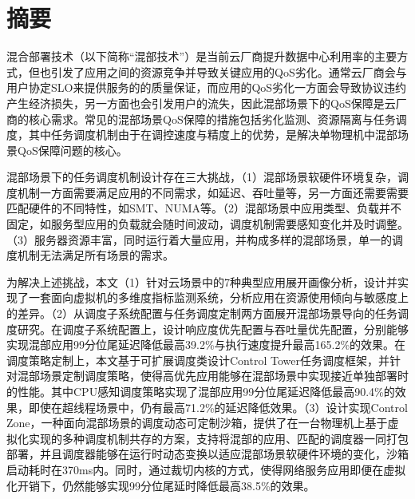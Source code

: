 
\maketitle%
\MAKETITLE%
\makedeclaration%
\intobmk\chapter*{摘\quad 要}%
\setcounter{page}{1}%


混合部署技术（以下简称“混部技术”）是当前云厂商提升数据中心利用率的主要方式，但也引发了应用之间的资源竞争并导致关键应用的QoS劣化。通常云厂商会与用户协定SLO来提供服务的的质量保证，而应用的QoS劣化一方面会导致协议违约产生经济损失，另一方面也会引发用户的流失，因此混部场景下的QoS保障是云厂商的核心需求。常见的混部场景QoS保障的措施包括劣化监测、资源隔离与任务调度，其中任务调度机制由于在调控速度与精度上的优势，是解决单物理机中混部场景QoS保障问题的核心。

混部场景下的任务调度机制设计存在三大挑战，（1）混部场景软硬件环境复杂，调度机制一方面需要满足应用的不同需求，如延迟、吞吐量等，另一方面还需要需要匹配硬件的不同特性，如SMT、NUMA等。（2）混部场景中应用类型、负载并不固定，如服务型应用的负载就会随时间波动，调度机制需要感知变化并及时调整。（3）服务器资源丰富，同时运行着大量应用，并构成多样的混部场景，单一的调度机制无法满足所有场景的需求。

为解决上述挑战，本文（1）针对云场景中的7种典型应用展开画像分析，设计并实现了一套面向虚拟机的多维度指标监测系统，分析应用在资源使用倾向与敏感度上的差异。（2）从调度子系统配置与任务调度定制两方面展开混部场景导向的任务调度研究。在调度子系统配置上，设计响应度优先配置与吞吐量优先配置，分别能够实现混部应用99分位尾延迟降低最高39.2\%与执行速度提升最高165.2\%的效果。在调度策略定制上，本文基于可扩展调度类设计Control Tower任务调度框架，并针对混部场景定制调度策略，使得高优先应用能够在混部场景中实现接近单独部署时的性能。其中CPU感知调度策略实现了混部应用99分位尾延迟降低最高90.4\%的效果，即使在超线程场景中，仍有最高71.2\%的延迟降低效果。（3）设计实现Control Zone，一种面向混部场景的调度动态可定制沙箱，提供了在一台物理机上基于虚拟化实现的多种调度机制共存的方案，支持将混部的应用、匹配的调度器一同打包部署，并且调度器能够在运行时动态变换以适应混部场景软硬件环境的变化，沙箱启动耗时在370ms内。同时，通过裁切内核的方式，使得网络服务应用即便在虚拟化开销下，仍然能够实现99分位尾延时降低最高38.5\%的效果。

